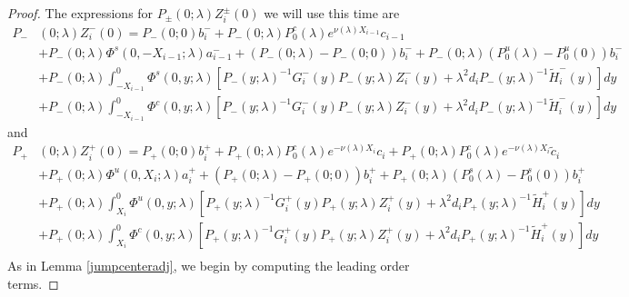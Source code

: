 \documentclass[thesis.tex]{subfiles}
\begin{document}
\begin{lemma}
\begin{proof}
The expressions for $P_\pm(0; \lambda) Z_i^\pm(0)$ we will use this time are
\begin{align*}
P_-&(0; \lambda) Z_i^-(0) = P_-(0; 0) b_i^- + P_-(0; \lambda)P_0^c(\lambda) e^{\nu(\lambda) X_{i-1}} c_{i-1}  \\
&+ P_-(0; \lambda) \Phi^s(0, -X_{i-1}; \lambda) a_{i-1}^- + (P_-(0; \lambda) - P_-(0; 0))b_i^- + P_-(0; \lambda)(P_0^u(\lambda) - P_0^u(0))b_i^- \\
&+ P_-(0; \lambda) \int_{-X_{i-1}}^0 \Phi^s(0, y; \lambda) [P_-(y; \lambda)^{-1} G_i^-(y) P_-(y; \lambda)Z_i^-(y) + \lambda^2 d_i P_-(y; \lambda)^{-1} \tilde{H}_i^-(y)] dy \\
&+ P_-(0; \lambda) \int_{-X_{i-1}}^0 \Phi^c(0, y; \lambda) [P_-(y; \lambda)^{-1} G_i^-(y) P_-(y; \lambda)Z_i^-(y) + \lambda^2 d_i P_-(y; \lambda)^{-1} \tilde{H}_i^-(y)] dy
\end{align*}
and
\begin{align*}
P_+&(0; \lambda) Z_i^+(0) = P_+(0; 0) b_i^+ + P_+(0; \lambda) P_0^c(\lambda) e^{-\nu(\lambda)X_i} c_i + P_+(0; \lambda) P_0^c(\lambda) e^{-\nu(\lambda)X_i} \tilde{c}_i \\
&+ P_+(0; \lambda) \Phi^u(0, X_i; \lambda) a_i^+ + (P_+(0; \lambda) - P_+(0; 0)) b_i^+ + P_+(0; \lambda) (P_0^s(\lambda) - P_0^s(0)) b_i^+ \\
&+ P_+(0; \lambda) \int_{X_i}^0 \Phi^u(0, y; \lambda) [P_+(y; \lambda)^{-1} G_i^+(y) P_+(y; \lambda) Z_i^+(y) + \lambda^2 d_i P_+(y; \lambda)^{-1} \tilde{H}_i^+(y)] dy \\
&+ P_+(0; \lambda) \int_{X_i}^0 \Phi^c(0, y; \lambda) [P_+(y; \lambda)^{-1} G_i^+(y) P_+(y; \lambda) Z_i^+(y) + \lambda^2 d_i P_+(y; \lambda)^{-1} \tilde{H}_i^+(y)] dy \\
\end{align*}
As in Lemma \ref{jumpcenteradj}, we begin by computing the leading order terms.


\end{proof}
\end{lemma}
\end{document}
